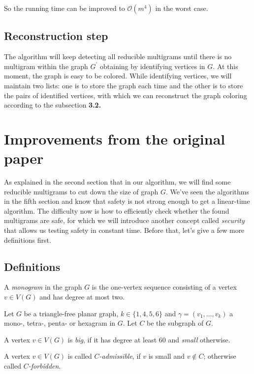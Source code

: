 So the running time can be improved to $\mathcal{O}(m^4)$ in the worst case. 
\subsection{Reconstruction step}
The algorithm will keep detecting all reducible multigrams until there is no multigram within the graph $G^{'}$ obtaining by identifying vertices in $G$. At this moment, the graph is easy to be colored. While identifying vertices, we will maintain two lists: one is to store the graph each time and the other is to store the pairs of identified vertices, with which we can reconstruct the graph coloring according to the subsection \textbf{3.2.}

\section{Improvements from the original paper}

As explained in the second section that in our algorithm, we will find some reducible multigrams to cut down the size of graph $G$. We've seen the algorithms in the fifth section and know that safety is not strong enough to get a linear-time algorithm. The difficulty now is how to efficiently check whether the found multigrams are safe, for which we will introduce another concept called \textit{security} that allows us testing safety in constant time. Before that, let's give a few more definitions first.

\subsection{Definitions}
\begin{definition}
A \textit{monogram} in the graph $G$ is the one-vertex sequence consisting of a vertex $v \in V(G)$ and has degree at most two. \cite{dvorak2013threecoloring} 
\end{definition}
Let $G$ be a triangle-free planar graph, $k \in \{1, 4, 5, 6\}$ and $\gamma = (v_1, ..., v_k)$ a mono-, tetra-, penta- or hexagram in $G$. Let $C$ be the subgraph of $G$.

\begin{definition}
A vertex $v \in V(G)$ is \textit{big}, if it has degree at least 60 and \textit{small} otherwise. \cite{dvorak2013threecoloring}
\end{definition}

\begin{definition}
A vertex $v \in V(G)$ is called \textit{$C$-admissible}, if $v$ is small and $v \notin C$; otherwise called \textit{$C$-forbidden}. \cite{dvorak2013threecoloring} 
\end{definition}

